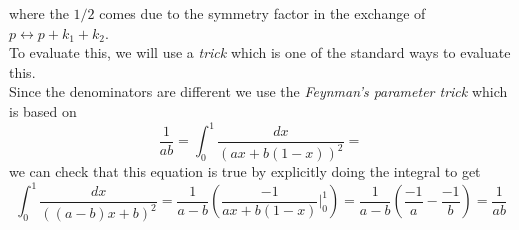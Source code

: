 \documentclass[11pt]{article}
\numberwithin{equation}{section}
\begin{document}
where the \(1/2\) comes due to the symmetry factor in the exchange of \(p\leftrightarrow p+k_1+k_2\).\\
To evaluate this, we will use a \textit{trick} which is one of the standard ways to evaluate this.\\
Since the denominators are different we use the \textit{Feynman's parameter trick} which is based on
\begin{equation*}
    \frac{1}{ab} = \int_0^1 \frac{dx}{(ax + b(1-x))^2} =  
\end{equation*}
we can check that this equation is true by explicitly doing the integral to get 
\begin{equation*}
    \int_0^1 \frac{dx}{((a-b)x + b)^2} = \frac{1}{a-b} \left(\frac{-1}{ax + b(1-x)}\bigg|_0^1 \right) = \frac{1}{a-b}\left( \frac{-1}{a} - \frac{-1}{b}  \right) = \frac{1}{ab}
\end{equation*}
\end{document}
